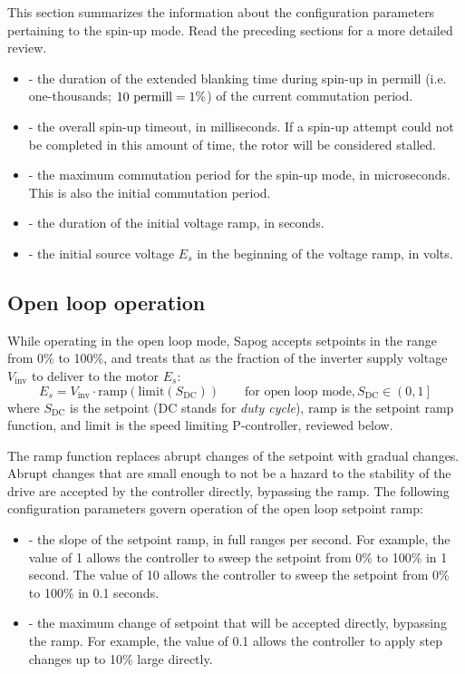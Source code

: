 \documentclass{zubaxdoc}
\begin{document}
This section summarizes the information about the configuration parameters pertaining to the spin-up mode.
Read the preceding sections for a more detailed review.

\begin{itemize}
\item {} - the duration of the extended blanking time during spin-up in permill
(i.e. one-thousands; $10\text{\space{}permill} = 1\% $) of the current commutation period.
\item {} - the overall spin-up timeout, in milliseconds.
If a spin-up attempt could not be completed in this amount of time, the rotor will be considered stalled.
\item {} - the maximum commutation period for the spin-up mode, in microseconds.
This is also the initial commutation period.
\item {} - the duration of the initial voltage ramp, in seconds.
\item {} - the initial source voltage $E_s$ in the beginning of the voltage ramp, in volts.
\end{itemize}

\subsection{Open loop operation}\label{sec:open_loop}

While operating in the open loop mode, Sapog accepts setpoints in the range from 0\% to 100\%,
and treats that as the fraction of the inverter supply voltage $V_\text{inv}$ to
deliver to the motor $E_s$:
\begin{equation}
E_s = V_\text{inv}\cdot{}\mathrm{ramp}\left(\mathrm{limit}\left(S_\text{DC}\right)\right)
\qquad\text{for open loop mode}, S_\text{DC} \in \left(0, 1\right]
\end{equation}
where $S_\text{DC}$ is the setpoint (DC stands for \emph{duty cycle}),
$\mathrm{ramp}$ is the setpoint ramp function,
and $\mathrm{limit}$ is the speed limiting P-controller, reviewed below.

The ramp function replaces abrupt changes of the setpoint with gradual changes.
Abrupt changes that are small enough to not be a hazard to the stability of the drive are
accepted by the controller directly, bypassing the ramp.
The following configuration parameters govern operation of the open loop setpoint ramp:

\begin{itemize}
\item {} - the slope of the setpoint ramp, in full ranges per second.
For example, the value of 1 allows the controller to sweep the setpoint from 0\% to 100\% in 1 second.
The value of 10 allows the controller to sweep the setpoint from 0\% to 100\% in 0.1 seconds.
\item {} - the maximum change of setpoint that will be accepted directly,
bypassing the ramp.
For example, the value of 0.1 allows the controller to apply step changes up to 10\% large directly.
\end{itemize}
\end{document}
